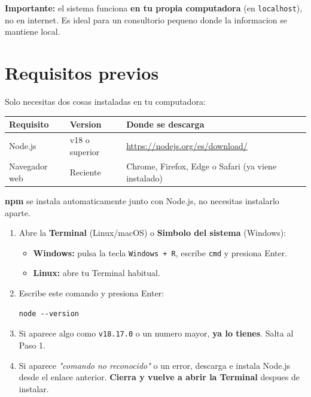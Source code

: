 \documentclass[11pt,a4paper]{article}
\begin{document}
\begin{cajaInfo}
    \textbf{Importante:} el sistema funciona \textbf{en tu propia computadora} (en \texttt{localhost}), no en internet. Es ideal para un consultorio pequeno donde la informacion se mantiene local.
\end{cajaInfo}

\section{Requisitos previos}

Solo necesitas dos cosas instaladas en tu computadora:

\begin{center}
    \begin{tabular}{|L{3.5cm}|L{3cm}|L{6cm}|}
        \hline
        \textbf{Requisito} & \textbf{Version} & \textbf{Donde se descarga}                          \\
        \hline
        Node.js
                           & v18 o superior   & \url{https://nodejs.org/es/download/}               \\
        \hline
        Navegador web      & Reciente         & Chrome, Firefox, Edge o Safari (ya viene instalado) \\
        \hline
    \end{tabular}
\end{center}

\begin{cajaTip}
    \textbf{npm} se instala automaticamente junto con Node.js, no necesitas instalarlo aparte.
\end{cajaTip}

\begin{enumerate}
    \item Abre la \textbf{Terminal} (Linux/macOS) o \textbf{Simbolo del sistema} (Windows):
          \begin{itemize}
              \item \textbf{Windows:} pulsa la tecla \texttt{Windows + R}, escribe \texttt{cmd} y presiona Enter.
              \item \textbf{Linux:} abre tu Terminal habitual.
          \end{itemize}
    \item Escribe este comando y presiona Enter:
          \begin{lstlisting}
node --version
\end{lstlisting}
    \item Si aparece algo como \texttt{v18.17.0} o un numero mayor, \textbf{ya lo tienes}. Salta al Paso 1.
    \item Si aparece \textit{"comando no reconocido"} o un error, descarga e instala Node.js desde el enlace anterior. \textbf{Cierra y vuelve a abrir la Terminal} despues de instalar.
\end{enumerate}
\end{document}
